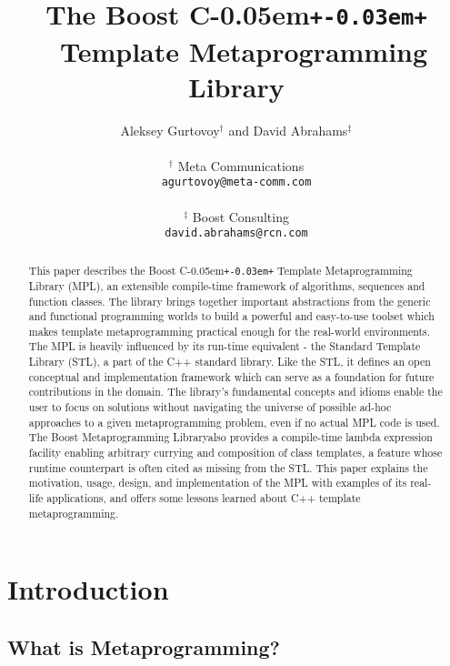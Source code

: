 \documentclass{netobjectdays}
\newcommand{\Cpp}{C\kern-0.05em\texttt{+\kern-0.03em+}%
}
\newcommand{\Mpl}{Boost Meta\-program\-ming Library}
\newcommand{\mping}{meta\-program\-ming}
\begin{document}
\title{The Boost \Cpp\ Template Metaprogramming Library}

\author{Aleksey Gurtovoy$^\dag$ and David Abrahams$^\ddag$ \\
\\
$^\dag$ Meta Communications \\
\texttt{agurtovoy@meta-comm.com}\\
\\
$^\ddag$ Boost Consulting \\
\texttt{david.abrahams@rcn.com}
}

\maketitle

\begin{abstract} $\!$This paper describes the Boost \Cpp Template
Meta\-program\-ming Library (MPL), an extensible compile-time
framework of algorithms, sequences and function classes. The library
brings together important abstractions from the generic and functional
programming worlds to build a powerful and easy-to-use toolset which
makes template \mping{} practical enough for the real-world
environments. The MPL is heavily influenced by its run-time equivalent
- the Standard Template Library (STL), a part of the C++ standard
library. Like the STL, it defines an open conceptual and
implementation framework which can serve as a foundation for future
contributions in the domain. The library's fundamental concepts and
idioms enable the user to focus on solutions without navigating the
universe of possible ad-hoc approaches to a given \mping{} problem,
even if no actual MPL code is used.  The \Mpl also provides a
compile-time lambda expression facility enabling arbitrary currying
and composition of class templates, a feature whose runtime
counterpart is often cited as missing from the STL. This paper
explains the motivation, usage, design, and implementation of the MPL
with examples of its real-life applications, and offers some lessons
learned about C++ template \mping{}.
\end{abstract}


\section{Introduction}

\subsection{What is Metaprogramming?}
\end{document}
